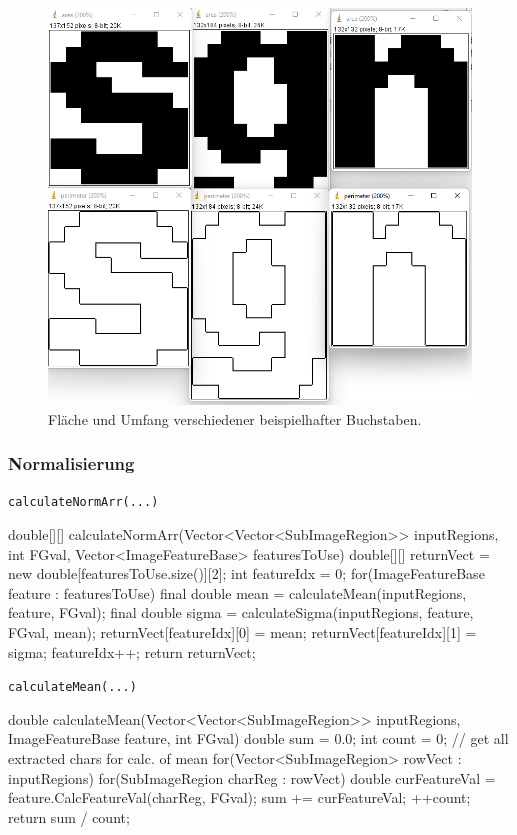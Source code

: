 \documentclass[german,notitlepage,smartquotes]{hgbreport}
\begin{document}
\begin{figure}[h]
\centering
\includegraphics[width=.7\textwidth]{area_perimeter}
\caption{Fläche und Umfang verschiedener beispielhafter Buchstaben.}
\label{fig:area_perimeter}
\end{figure}

\clearpage

\subsubsection{Normalisierung}

\begin{program}[h]
\caption{\texttt{calculateNormArr(...)}}
\label{prog:calc-norm-arr}
\begin{JavaCode}
double[][] calculateNormArr(Vector<Vector<SubImageRegion>> inputRegions, int FGval, Vector<ImageFeatureBase> featuresToUse) {
	double[][] returnVect = new double[featuresToUse.size()][2];
	int featureIdx = 0;
	for(ImageFeatureBase feature : featuresToUse) {
		final double mean = calculateMean(inputRegions, feature, FGval);
		final double sigma = calculateSigma(inputRegions, feature, FGval, mean);
		returnVect[featureIdx][0] = mean;
		returnVect[featureIdx][1] = sigma;
		featureIdx++;
	}
	return returnVect;
}
\end{JavaCode}
\end{program}

\begin{program}[h]
\caption{\texttt{calculateMean(...)}}
\label{prog:calc-mean}
\begin{JavaCode}
double calculateMean(Vector<Vector<SubImageRegion>> inputRegions, ImageFeatureBase feature, int FGval) {
	double sum = 0.0;
	int count = 0;
	// get all extracted chars for calc. of mean
	for(Vector<SubImageRegion> rowVect : inputRegions) {
		for(SubImageRegion charReg : rowVect) {
			double curFeatureVal = feature.CalcFeatureVal(charReg, FGval);
			sum += curFeatureVal;
			++count;
		}
	}
	return sum / count;
}
\end{JavaCode}
\end{program}
\end{document}
